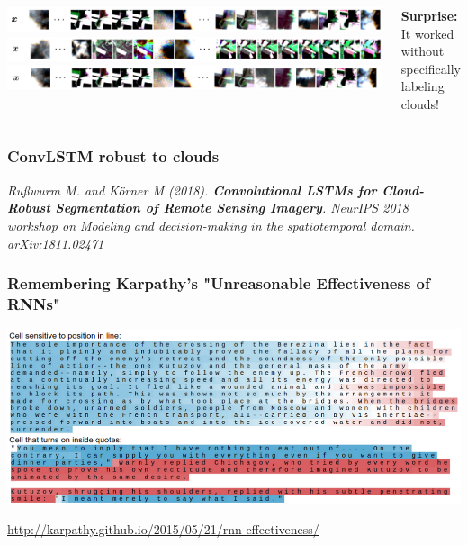 
\begin{frame}

\vfill
\Large\color{black}
\begin{center}
	\begin{columns}
		\column{\textwidth}
		
		
		\includegraphics[width=\textwidth]{images/x_1}
		\includegraphics[width=\textwidth]{images/x_2}
		\includegraphics[width=\textwidth]{images/x_3}
		
		\vspace{3em}
		
		
		\textbf{\color{tumbluedark}Surprise:} 
		\hfill It worked without specifically labeling clouds!
	\end{columns}
\end{center}

\vfill

\end{frame}

\begin{frame}
\frametitle{ConvLSTM robust to clouds}



\small\raggedright
\textsl{
	Rußwurm M. and Körner M (2018). \textbf{Convolutional LSTMs for Cloud-Robust Segmentation of Remote Sensing
	Imagery}. NeurIPS 2018 workshop on \textsl{Modeling and decision-making in the spatiotemporal domain}. arXiv:1811.02471
}

\end{frame}


\begin{frame}
	\frametitle{Remembering Karpathy's "Unreasonable Effectiveness of RNNs"}
	
	\includegraphics[width=\textwidth]{images/karpathy}
	
	\url{http://karpathy.github.io/2015/05/21/rnn-effectiveness/}
\end{frame}

